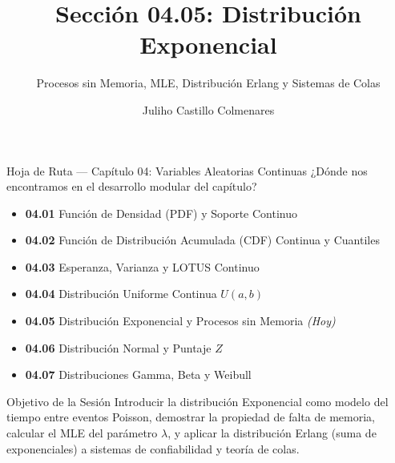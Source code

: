 \documentclass[10pt, aspectratio=169]{beamer}
\title[Distribución Exponencial]{Sección 04.05: Distribución Exponencial}
\subtitle{Procesos sin Memoria, MLE, Distribución Erlang y Sistemas de Colas}
\author[J. Castillo Colmenares]{Juliho Castillo Colmenares}
\institute{Tecnológico de Monterrey}
\date{\vspace{-1.2cm}}
\begin{document}
\begin{frame}[plain]
  \titlepage
\end{frame}

\begin{frame}{Hoja de Ruta --- Capítulo 04: Variables Aleatorias Continuas}
  \footnotesize
  ¿Dónde nos encontramos en el desarrollo modular del capítulo? \pause
  \begin{itemize}\itemsep=0.08em
    \item \textbf{04.01} Función de Densidad (PDF) y Soporte Continuo \pause
    \item \textbf{04.02} Función de Distribución Acumulada (CDF) Continua y Cuantiles \pause
    \item \textbf{04.03} Esperanza, Varianza y LOTUS Continuo \pause
    \item \textbf{04.04} Distribución Uniforme Continua $U(a, b)$ \pause
    \item \textbf{04.05} Distribución Exponencial y Procesos sin Memoria \emph{(Hoy)} \pause
    \item \textbf{04.06} Distribución Normal y Puntaje $Z$ \pause
    \item \textbf{04.07} Distribuciones Gamma, Beta y Weibull
  \end{itemize}
  \vspace{-0.05cm}
  \begin{block}{Objetivo de la Sesión}
    Introducir la distribución Exponencial como modelo del tiempo entre eventos Poisson, demostrar la propiedad de falta de memoria, calcular el MLE del parámetro $\lambda$, y aplicar la distribución Erlang (suma de exponenciales) a sistemas de confiabilidad y teoría de colas.
  \end{block}
\end{frame}
\end{document}

